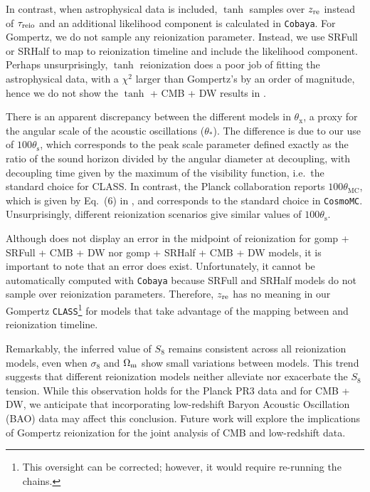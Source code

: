 In contrast, when astrophysical data is included, $\tanh$ samples over
$z_{\mathrm{re}}$ instead of $\tau_{\mathrm{reio}}$ and an additional likelihood component
is calculated in \texttt{Cobaya}.
For Gompertz, we do not sample any reionization parameter.
Instead, we use SRFull or SRHalf to map  to
reionization timeline and include the  likelihood
component.
Perhaps unsurprisingly, $\tanh$ reionization does a poor job of fitting
the astrophysical data, with a $\chi^2$ larger than Gompertz's by an
order of magnitude, hence we do not show the $\tanh$ + CMB + DW results
in .

There is an apparent discrepancy between the different models in
$\theta_\mathrm{x}$, a proxy for the angular scale of the acoustic
oscillations ($\theta_*$).
The difference is due to our use of $100\theta_\mathrm{s}$, which
corresponds to the peak scale parameter defined exactly as the ratio of
the sound horizon divided by the angular diameter at decoupling, with
decoupling time given by the maximum of the visibility function, i.e.\
the standard choice for CLASS.
In contrast, the Planck collaboration reports $100\theta_\mathrm{MC}$,
which is given by Eq.~(6) in \cite{Planck2014}, and corresponds to the
standard choice in \texttt{CosmoMC}\cite{Lewis2002}.
Unsurprisingly, different reionization scenarios give similar values of
$100\theta_\mathrm{s}$.

Although  does not display an error in the midpoint
of reionization for gomp + SRFull + CMB + DW nor gomp + SRHalf + CMB +
DW models, it is important to note that an error does exist.
Unfortunately, it cannot be automatically computed with \texttt{Cobaya}
because SRFull and SRHalf models do not sample over reionization
parameters.
Therefore, $z_{\mathrm{re}}$ has no meaning in our Gompertz
\texttt{CLASS}\footnote{This oversight can be corrected; however, it
would require re-running the chains.} for models that take advantage of
the mapping between \YL{physical parameters} and reionization timeline.

Remarkably, the inferred value of $S_8$ remains consistent across all
reionization models, even when $\sigma_8$ and $\Omega_\mathrm{m}$ show small
variations between models.
This trend suggests that different reionization models neither alleviate
nor exacerbate the $S_8$ tension.
While this observation holds for the Planck PR3 data and for CMB + DW,
we anticipate that incorporating low-redshift Baryon Acoustic
Oscillation (BAO) data may affect this conclusion.
Future work will explore the implications of Gompertz reionization for
the joint analysis of CMB and low-redshift data.


\FloatBarrier
